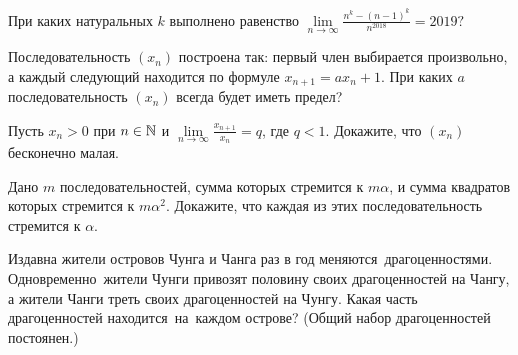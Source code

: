 \documentclass[a4paper,11pt]{article}
\begin{document}








%

При каких натуральных $k$ выполнено равенство
$
\displaystyle{
\lim\limits_{n\rightarrow\infty}\frac{n^k-(n-1)^k}{n^{2018}}=2019?}
$



 Последовательность $(x_n)$ построена так: первый член выбирается произвольно, а каждый следующий находится по формуле $x_{n+1}=ax_n+1$. При каких $a$ последовательность $(x_n)$ всегда будет иметь предел?

Пусть $x_n>0$ при $n\in\mathbb{N}$ и $\displaystyle{\lim\limits_{n \to \infty}\frac{x_{n+1}}{x_{n}}}=q$, где $q<1$.
Докажите, что %
$(x_n)$ бесконечно малая.


Дано $m$ последовательностей, сумма которых
стремится к $m\alpha$, и сумма квадратов которых
стремится к $m\alpha^2$. Докажите, что каждая из этих
последовательность стремится к $\alpha$.










Издавна жители островов Чунга и Чанга раз в год
меняются~драгоцен\-ностями. Одновременно~жители Чунги привозят
половину своих драгоценностей на Чангу, а жители
Чанги %
треть своих драгоценностей на
Чунгу.
Какая часть драгоценностей находится~на~каж\-дом острове?
(Общий набор драгоценностей постоянен.) %
\end{document}
